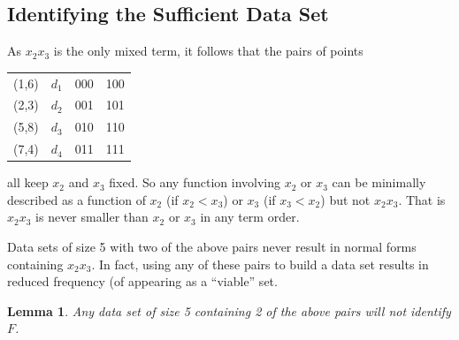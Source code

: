 \documentclass{amsart}
\newtheorem{lem}[thm]{Lemma}
\theoremstyle{definition}
\theoremstyle{remark}
\theoremstyle{example}
\theoremstyle{conjecture}
\numberwithin{equation}{section}
\begin{document}
\subsection{Identifying the Sufficient Data Set}
As $x_2x_3$ is the only mixed term, it follows that the pairs of
points

\begin{center}
\begin{tabular}{|c|c|c|c|}
  \hline
  (1,6) & $d_1$ & 000 & 100 \\
  (2,3) & $d_2$ & 001 & 101 \\
  (5,8) & $d_3$ & 010 & 110 \\
  (7,4) & $d_4$ & 011 & 111 \\
  \hline
\end{tabular}
\end{center}
%
all keep $x_2$ and $x_3$ fixed. So any function involving $x_2$ or
$x_3$ can be minimally described as a function of $x_2$ (if
$x_2<x_3$) or $x_3$ (if $x_3<x_2$)  but not $x_2x_3$.  That is
$x_2x_3$ is never smaller than $x_2$ or $x_3$ in any term order.


Data sets of size 5 with two of the above pairs never result in
normal forms containing $x_2x_3$. In fact, using any of these pairs
to build a data set results in reduced frequency (of appearing as a ``viable'' set.


\begin{lem}
Any data set of size 5 containing 2 of the above pairs will not
identify $F$.
\end{lem}
\end{document}
